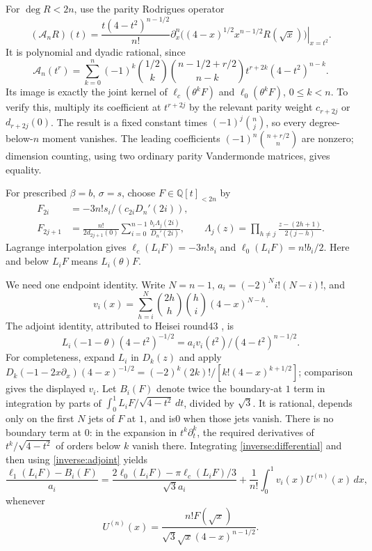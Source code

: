\documentclass[11pt,a4paper]{article}
\numberwithin{equation}{section}
\theoremstyle{definition}\newtheorem{definition}[theorem]{Definition}
\theoremstyle{remark}\newtheorem{remark}[theorem]{Remark}
\newcommand{\Q}{\mathbb Q}\newcommand{\Z}{\mathbb Z}\newcommand{\R}{\mathbb R}
\newcommand{\A}{\mathcal A}\newcommand{\Vd}{\mathcal V}\newcommand{\Rp}{\mathbb Z_{(p)}}
\newcommand{\lc}{\ell_c}\newcommand{\ld}{\ell_0}\newcommand{\leone}{\ell_1}
\begin{document}
For $\deg R<2n$, use the parity Rodrigues operator
\begin{equation}\label{inverse:rod}
 (\A_nR)(t)=\frac{t(4-t^2)^{n-1/2}}{n!}
 \left.\partial_x^n\big((4-x)^{1/2}x^{n-1/2}R(\sqrt x)\big)\right|_{x=t^2}.
\end{equation}
It is polynomial and dyadic rational, since
\begin{equation}\label{inverse:dyadic}
 \A_n(t^r)=\sum_{k=0}^n(-1)^k\binom{1/2}{k}
 \binom{n-1/2+r/2}{n-k}t^{r+2k}(4-t^2)^{n-k}.
\end{equation}
Its image is exactly the joint kernel of $\lc(\theta^kF)$ and $\ld(\theta^kF)$, $0\le k<n$. To verify this, multiply its coefficient at $t^{r+2j}$ by the relevant parity weight $c_{r+2j}$ or $d_{r+2j}(0)$. The result is a fixed constant times $(-1)^j\binom nj$, so every degree-below-$n$ moment vanishes. The leading coefficients $(-1)^n\binom{n+r/2}{n}$ are nonzero; dimension counting, using two ordinary parity Vandermonde matrices, gives equality.

For prescribed $\beta=b$, $\sigma=s$, choose $F\in\Q[t]_{<2n}$ by
\begin{align}
 F_{2i}&=-3n!s_i/(c_{2i}D_n'(2i)),\label{inverse:particular}\\
 F_{2j+1}&=\frac{n!}{2d_{2j+1}(0)}
 \sum_{i=0}^{n-1}\frac{b_i\Lambda_j(2i)}{D_n'(2i)},\qquad
 \Lambda_j(z)=\prod_{h\ne j}\frac{z-(2h+1)}{2(j-h)}.\nonumber
\end{align}
Lagrange interpolation gives $\lc(L_iF)=-3n!s_i$ and $\ld(L_iF)=n!b_i/2$. Here and below $L_iF$ means $L_i(\theta)F$.

We need one endpoint identity. Write $N=n-1$, $a_i=(-2)^Ni!(N-i)!$, and
\[
 v_i(x)=\sum_{h=i}^{N}\binom{2h}h\binom hi(4-x)^{N-h}.
\]
The adjoint identity, attributed to Heisei round43 \cite{H43}, is
\begin{equation}\label{inverse:adjoint}
 L_i(-1-\theta)(4-t^2)^{-1/2}
   =a_i v_i(t^2)/(4-t^2)^{n-1/2}.
\end{equation}
For completeness, expand $L_i$ in $D_k(z)$ and apply
$D_k(-1-2x\partial_x)(4-x)^{-1/2}
 =(-2)^k(2k)!/[k!(4-x)^{k+1/2}]$; comparison gives the displayed $v_i$.
Let $B_i(F)$ denote twice the boundary-at $1$ term in integration by parts of
$\int_0^1 L_iF/\sqrt{4-t^2}\,dt$, divided by $\sqrt3$.
It is rational, depends only on the first $N$ jets of $F$ at $1$, and is0 when those jets vanish. There is no boundary term at $0$: in the expansion in $t^k\partial_t^k$, the required derivatives of $t^k/\sqrt{4-t^2}$ of orders below $k$ vanish there.
Integrating \eqref{inverse:differential} and then using \eqref{inverse:adjoint} yields
\begin{equation}\label{inverse:endpoint}
 \frac{\leone(L_iF)-B_i(F)}{a_i}
 =\frac{2\ld(L_iF)-\pi\lc(L_iF)/3}{\sqrt3a_i}
  +\frac1{n!}\int_0^1 v_i(x)U^{(n)}(x)\,dx,
\end{equation}
whenever
\begin{equation}\label{inverse:primitive}
 U^{(n)}(x)=\frac{n!F(\sqrt x)}{\sqrt3\sqrt x(4-x)^{n-1/2}}.
\end{equation}
\end{document}
